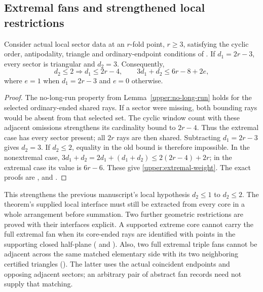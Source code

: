 \subsection{Extremal fans and strengthened local restrictions}
\label{upper:extremal-fans}

\begin{theorem}
\label{upper:extremal-structure}
Consider actual local sector data at an $r$-fold point, $r\ge3$, satisfying
the cyclic order, antipodality, triangle and ordinary-endpoint conditions
of . If $d_1=2r-3$, every sector is triangular
and $d_2=3$. Consequently,
\begin{equation}
 d_2\le2\Longrightarrow d_1\le2r-4,
 \qquad 3d_1+d_2\le6r-8+2e,
 \label{upper:extremal-weight}
\end{equation}
where $e=1$ when $d_1=2r-3$ and $e=0$ otherwise.
\end{theorem}

\begin{proof}
The no-long-run property from Lemma~\ref{upper:no-long-run} holds for
the selected ordinary-ended shared rays. If a sector were missing,
both bounding rays would be absent from that selected set. The cyclic
window count with these adjacent omissions strengthens its cardinality
bound to $2r-4$. Thus the extremal case has every sector present; all
$2r$ rays are then shared. Subtracting $d_1=2r-3$ gives $d_2=3$.
If $d_2\le2$, equality in the old bound is therefore impossible.
In the nonextremal case,
$3d_1+d_2=2d_1+(d_1+d_2)\le2(2r-4)+2r$; in the extremal case its
value is $6r-6$. These give \eqref{upper:extremal-weight}.
The exact proofs are
,
and .
\end{proof}

This strengthens the previous manuscript's local hypothesis $d_2\le1$
to $d_2\le2$. The theorem's supplied local interface must still be
extracted from every core in a whole arrangement before summation.
Two further geometric restrictions are proved with their interfaces
explicit. A supported extreme core cannot carry the full extremal fan
when its core-ended rays are identified with points in the supporting
closed half-plane ( and
). Also, two full extremal triple fans cannot
be adjacent across the same matched elementary side with its two
neighboring certified triangles (). The latter
uses the actual coincident endpoints and opposing adjacent sectors;
an arbitrary pair of abstract fan records need not supply that matching.


